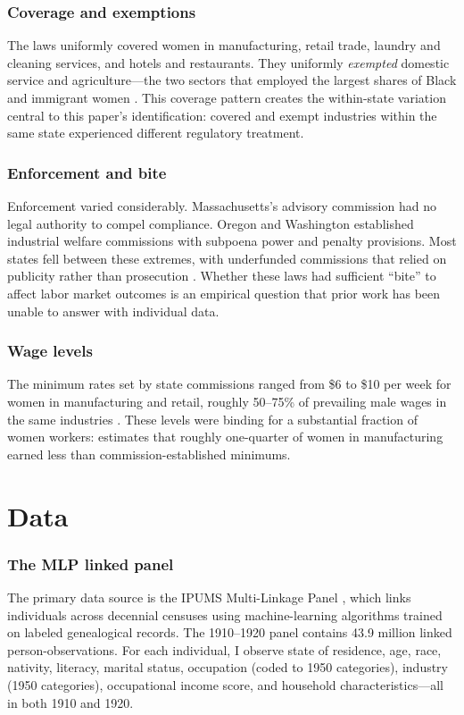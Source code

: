 \documentclass[12pt]{article}
\begin{document}
\subsubsection*{Coverage and exemptions} The laws uniformly covered women in manufacturing, retail trade, laundry and cleaning services, and hotels and restaurants. They uniformly \textit{exempted} domestic service and agriculture---the two sectors that employed the largest shares of Black and immigrant women \citep{goldin1990understanding}. This coverage pattern creates the within-state variation central to this paper's identification: covered and exempt industries within the same state experienced different regulatory treatment.

\subsubsection*{Enforcement and bite} Enforcement varied considerably. Massachusetts's advisory commission had no legal authority to compel compliance. Oregon and Washington established industrial welfare commissions with subpoena power and penalty provisions. Most states fell between these extremes, with underfunded commissions that relied on publicity rather than prosecution \citep{seltzer2020}. Whether these laws had sufficient ``bite'' to affect labor market outcomes is an empirical question that prior work has been unable to answer with individual data.

\subsubsection*{Wage levels} The minimum rates set by state commissions ranged from \$6 to \$10 per week for women in manufacturing and retail, roughly 50--75\% of prevailing male wages in the same industries \citep{thies1991first}. These levels were binding for a substantial fraction of women workers: \citet{goldin1990understanding} estimates that roughly one-quarter of women in manufacturing earned less than commission-established minimums.

\section{Data}
\label{sec:data}

\subsubsection*{The MLP linked panel} The primary data source is the IPUMS Multi-Linkage Panel \citep{helgertz2023}, which links individuals across decennial censuses using machine-learning algorithms trained on labeled genealogical records. The 1910--1920 panel contains 43.9 million linked person-observations. For each individual, I observe state of residence, age, race, nativity, literacy, marital status, occupation (coded to 1950 categories), industry (1950 categories), occupational income score, and household characteristics---all in both 1910 and 1920.
\end{document}
